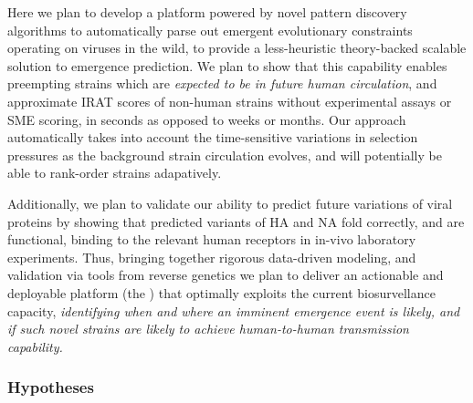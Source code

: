 \documentclass[onecolumn, compsoc,12pt]{IEEEtran}
\begin{document}
Here we plan to develop a platform powered by novel pattern discovery  algorithms to automatically parse out emergent evolutionary constraints operating on \infl viruses in the wild, to provide a less-heuristic theory-backed scalable solution to emergence prediction. We plan to show   that this capability enables preempting  strains which are \textit{expected to be in future human circulation}, and  approximate IRAT scores of non-human strains without  experimental assays or SME scoring, in seconds as opposed to weeks or months. Our approach automatically takes into account the time-sensitive variations in selection pressures as the background strain circulation evolves, and will potentially be able to rank-order strains adapatively.

Additionally, we plan to validate our ability to predict future variations of viral proteins by showing that predicted variants of HA and NA fold correctly, and are functional, binding to the relevant human receptors in in-vivo laboratory experiments. Thus, bringing together rigorous data-driven modeling, and validation via tools from reverse genetics we plan to deliver an actionable and deployable platform (the \bnd) that optimally exploits the current biosurvellance capacity,  \textit{identifying when and where an imminent  emergence event is likely, and if such novel strains are likely to achieve human-to-human transmission capability.}

  


\subsubsection*{Hypotheses} %
\end{document}
